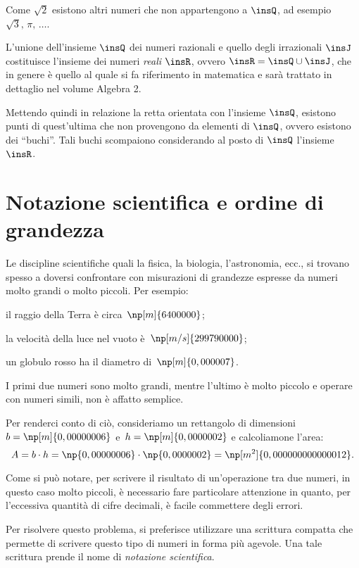 Come $\sqrt{2}$ esistono altri numeri che non appartengono a $\insQ$, ad esempio $\sqrt{3}\text{,~}\pi\text{,~}\ldots{}$.

L'unione dell'insieme $\insQ$ dei numeri razionali e quello degli irrazionali $\insJ$ costituisce l'insieme dei numeri \emph{reali} $\insR$, ovvero $\insR = \insQ \cup \insJ$, che in genere è quello al quale si fa riferimento in matematica e sarà trattato in dettaglio nel volume Algebra 2.

Mettendo quindi in relazione la retta orientata con l'insieme $\insQ$, esistono punti di quest'ultima che non provengono da elementi di $\insQ$, ovvero esistono dei ``buchi''. Tali buchi scompaiono considerando al posto di $\insQ$ l'insieme $\insR$.

\section{Notazione scientifica e ordine di grandezza}

Le discipline scientifiche quali la fisica, la biologia, l'astronomia, ecc.,
si trovano spesso a doversi confrontare con misurazioni di grandezze espresse da numeri molto grandi o molto piccoli. Per esempio:
\begin{itemize*}
\item il raggio della Terra è circa~$\np[m]{6400000}$;
\item la velocità della luce nel vuoto è~$\np[m/s]{299790000}$;
\item un globulo rosso ha il diametro di~$\np[m]{0,000007}$.
\end{itemize*}
I primi due numeri sono molto grandi, mentre l'ultimo è molto piccolo e operare con numeri simili,
non è affatto semplice.

Per renderci conto di ciò, consideriamo un rettangolo di dimensioni
$b = \np[m]{0,00000006}$ e~$h = \np[m]{0,0000002}$ e calcoliamone l'area:
\[A=b\cdot h=\np{0,00000006}\cdot\np{0,0000002}=\np[m^2]{0,000000000000012}.\]

\begin{center}

\end{center}

Come si può notare, per scrivere il risultato di un'operazione tra due numeri, in questo caso molto piccoli,
è necessario fare particolare attenzione in quanto, per l'eccessiva quantità di cifre decimali,
è facile commettere degli errori.

Per risolvere questo problema, si preferisce utilizzare una scrittura compatta che
permette di scrivere questo tipo di numeri in forma più agevole.
Una tale scrittura prende il nome di \emph{notazione scientifica}.

